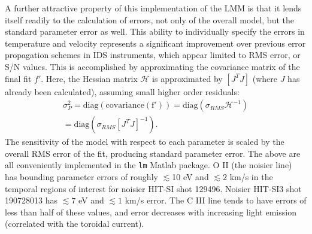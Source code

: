 \hspace*{4ex}A further attractive property of this implementation of the LMM is that it lends itself readily to the calculation of errors, not only of the overall model, but the standard parameter error as well. This ability to individually specify the errors in temperature and velocity represents a significant improvement over previous error propagation schemes in IDS instruments, which appear limited to RMS error, or S/N values. This is accomplished by approximating the covariance matrix of the final fit $f'$. Here, the Hessian matrix $\mathcal{H}$ is approximated by $[J^TJ]$ (where $J$ has already been calculated), assuming small higher order residuals\cite{yuen2010bayesian}:
\begin{eqnarray}
\sigma_P^2 =\mathrm{diag(covariance(f'))}= \mathrm{diag}(\sigma_{RMS}\mathcal{H}^{-1})\nonumber\\ = \mathrm{diag}(\sigma_{RMS}[J^TJ]^{-1}).
\end{eqnarray}
The sensitivity of the model with respect to each parameter is scaled by the overall RMS error of the fit, producing standard parameter error. The above are all conveniently implemented in the \texttt{lm} Matlab package. O II (the noisier line) has bounding parameter errors of roughly $\lesssim$10 eV and $\lesssim2$ km/s in the temporal regions of interest for noisier HIT-SI shot 129496. Noisier HIT-SI3 shot 190728013 has $\lesssim7$ eV and $\lesssim1$ km/s error. The C III line tends to have errors of less than half of these values, and error decreases with increasing light emission (correlated with the toroidal current).




